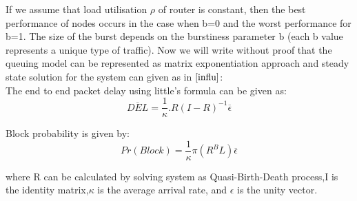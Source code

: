 If we assume that load utilisation $\rho$ of router is constant, then the best performance of nodes occurs in the case when b=0  and the worst performance for b=1. The size of the burst depends on the burstiness parameter b (each b value represents a unique type of traffic). Now we will write without proof that the queuing model can be represented as matrix exponentiation approach and steady state solution for the system can given as in $\cite{influ}$:\\
The end to end packet delay using little's formula can be given as:\\
\begin{equation}
\overline{DEL} = \frac{1}{\kappa}.R(I-R)^{-1}\overline{\epsilon}
\end{equation}
 
Block probability is given by:\\
\begin{equation}
Pr(Block) = \frac{1}{\kappa}{\pi}{(R^{B}L)}\overline{\epsilon}
\end{equation}

where  R can be calculated by solving system as Quasi-Birth-Death process,I is the identity matrix,$\kappa$ is the average arrival rate, and $\epsilon$ is the unity vector.


